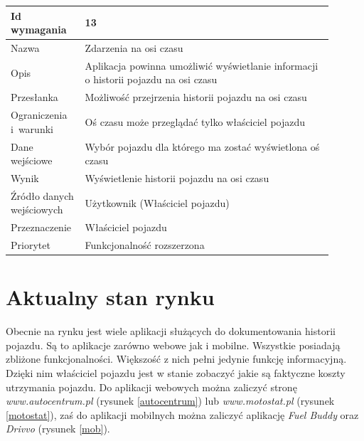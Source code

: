 \documentclass[12pt]{article}
\begin{document}
\begin{table}[H]
\begin{center}
	\begin{tabular}{|p{0.18\linewidth}|p{0.72\linewidth}|}%
	\hline
	Id wymagania 	& 13 				\\ \hline
	Nazwa			& Zdarzenia na osi czasu \\ \hline
	Opis &Aplikacja powinna umożliwić wyświetlanie informacji o historii pojazdu na osi czasu
\\ \hline
	Przesłanka & Możliwość przejrzenia historii pojazdu na osi czasu \\ \hline
	Ograniczenia i~warunki & Oś czasu może przeglądać tylko właściciel pojazdu \\ \hline
	Dane wejściowe & Wybór pojazdu dla którego ma zostać wyświetlona oś czasu \\ \hline
	Wynik &Wyświetlenie historii pojazdu na osi czasu\\ \hline
	Źródło danych wejściowych &Użytkownik (Właściciel pojazdu)\\ \hline
	Przeznaczenie & Właściciel pojazdu\\ \hline
	Priorytet & Funkcjonalność rozszerzona \\ \hline
	\end{tabular}
\end{center}
\end{table}
\newpage
\section{Aktualny stan rynku }
	
Obecnie na rynku jest wiele aplikacji służących do dokumentowania historii pojazdu. Są to aplikacje zarówno webowe jak i mobilne. Wszystkie posiadają zbliżone funkcjonalności. Większość z nich pełni jedynie funkcję informacyjną. Dzięki nim właściciel pojazdu jest w stanie zobaczyć jakie są faktyczne koszty utrzymania pojazdu. Do aplikacji webowych można zaliczyć stronę \textit{www.autocentrum.pl} (rysunek \ref{autocentrum}) lub \textit{www.motostat.pl} (rysunek \ref{motostat}), zaś do aplikacji mobilnych można zaliczyć aplikację \textit{Fuel Buddy} oraz \textit{Drivvo} (rysunek \ref{mob}). \\
\end{document}
